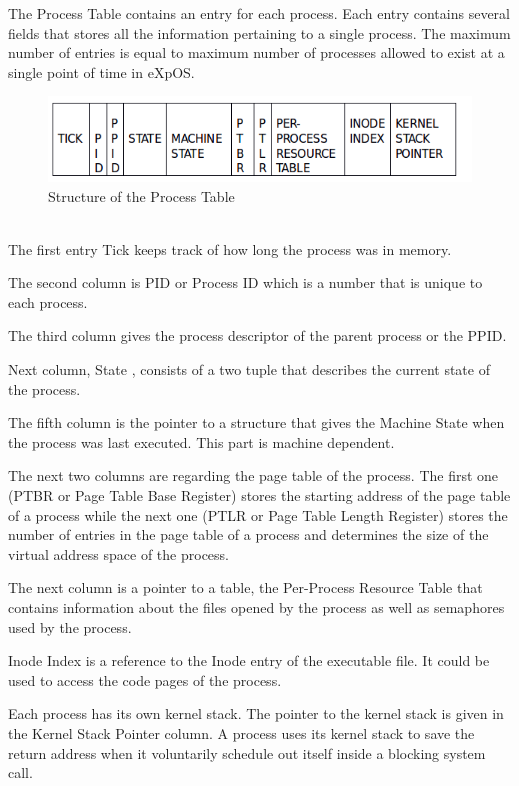 \documentclass[11pt ,twosided]{article}
\begin{document}
The Process Table contains an entry for each process.  Each entry contains several fields that stores all the information pertaining to a single process. The maximum number of entries is equal to maximum number of processes allowed to exist at a single point of time in eXpOS.
\begin{figure}[ht]
\centering
\includegraphics[scale=0.60]{Process_table.png}
\caption{\footnotesize Structure of the Process Table}
\label{fig_2}
\end{figure}
\\

The first entry Tick keeps track of how long the process was in memory.

The second column is PID or Process ID which is a number that is unique to each process.

The third column gives the process descriptor of the parent process or the PPID.

Next column, State , consists of a two tuple that describes the current state of the process.

The fifth column is the pointer to a structure that gives the Machine State when the process was last executed.  This part is machine dependent. 

The next two columns are regarding the page table of the process. The first one (PTBR or Page Table Base Register) stores the starting address of the page table of a process while the next one (PTLR or Page Table Length Register) stores the number of entries in the page table of a process and determines the size of the virtual address space of the process.

The next column is a pointer to a table, the Per-Process Resource Table that contains information about the files opened by the process as well as semaphores used by the process.

Inode Index is a reference to the Inode entry of the executable file. It could be used to access the code pages of the process.

Each process has its own kernel stack. The pointer to the kernel stack is given in the Kernel Stack Pointer column. A process uses its kernel stack to save the return address when it voluntarily schedule out itself inside a blocking system call. 
\end{document}
